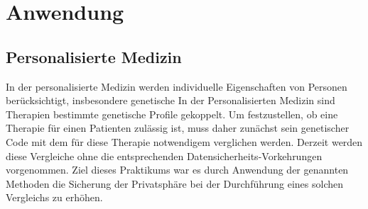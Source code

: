 \section{Anwendung}

\subsection{Personalisierte Medizin}
In der personalisierte Medizin werden individuelle Eigenschaften von Personen berücksichtigt, insbesondere genetische 
In der Personalisierten Medizin sind  Therapien bestimmte genetische Profile  gekoppelt.
Um festzustellen, ob eine Therapie für einen Patienten zulässig ist, muss daher zunächst sein genetischer Code mit dem für diese Therapie notwendigem verglichen werden.
Derzeit werden diese Vergleiche ohne die entsprechenden Datensicherheits-Vorkehrungen vorgenommen.
Ziel dieses Praktikums war es durch Anwendung der genannten Methoden die Sicherung der Privatsphäre bei der Durchführung eines solchen Vergleichs zu erhöhen.


